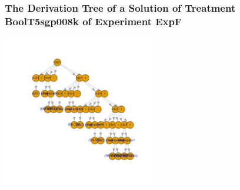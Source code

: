  \begin{frame}
 \frametitle{ The Derivation Tree of a Solution of Treatment BoolT5sgp008k of Experiment ExpF }
 \begin{center}
\includegraphics[width=0.5\textwidth, angle=0]
{ExpFDerivationTreeFigure006.pdf}
 \end{center}
 \label{templateReport/ExpFDerivationTreeFigure006.pdf}  
 \end{frame}

